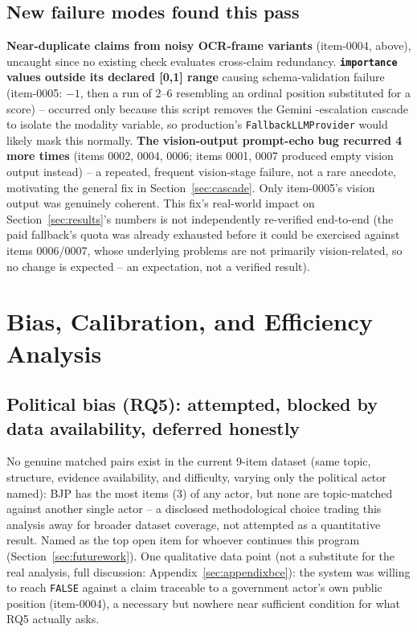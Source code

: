 \documentclass[conference]{IEEEtran}
\begin{document}
\subsection{New failure modes found this pass}
\textbf{Near-duplicate claims from noisy OCR-frame variants}
(item-0004, above), uncaught since no existing check evaluates
cross-claim redundancy. \textbf{\texttt{importance} values outside its
declared [0,1] range} causing schema-validation failure (item-0005:
$-1$, then a run of 2--6 resembling an ordinal position substituted for a
score) -- occurred only because this script removes the Gemini
-escalation cascade to isolate the modality variable, so production's
\texttt{FallbackLLMProvider} would likely mask this normally.
\textbf{The vision-output prompt-echo bug recurred 4 more times}
(items 0002, 0004, 0006; items 0001, 0007 produced empty vision output
instead) -- a repeated, frequent vision-stage failure, not a rare
anecdote, motivating the general fix in Section~\ref{sec:cascade}. Only
item-0005's vision output was genuinely coherent. This fix's real-world
impact on Section~\ref{sec:results}'s numbers is not independently
re-verified end-to-end (the paid fallback's quota was already exhausted
before it could be exercised against items 0006/0007, whose underlying
problems are not primarily vision-related, so no change is expected --
an expectation, not a verified result).

\section{Bias, Calibration, and Efficiency Analysis}
\label{sec:bce}

\subsection{Political bias (RQ5): attempted, blocked by data availability, deferred honestly}
No genuine matched pairs exist in the current 9-item dataset (same topic,
structure, evidence availability, and difficulty, varying only the
political actor named): BJP has the most items (3) of any actor, but none
are topic-matched against another single actor -- a disclosed
methodological choice trading this analysis away for broader dataset
coverage, not attempted as a quantitative result. Named as the top open
item for whoever continues this program (Section~\ref{sec:futurework}).
One qualitative data point (not a substitute for the real analysis,
full discussion: Appendix~\ref{sec:appendixbce}): the system was willing
to reach \texttt{FALSE} against a claim traceable to a government actor's
own public position (item-0004), a necessary but nowhere near sufficient
condition for what RQ5 actually asks.
\end{document}
